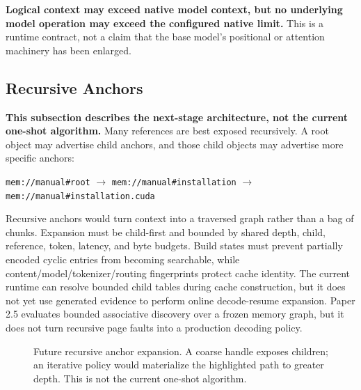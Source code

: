 \documentclass[11pt]{article}
\begin{document}
\textbf{Logical context may exceed native model context, but no underlying model operation
may exceed the configured native limit.} This is a runtime contract, not a claim that the
base model's positional or attention machinery has been enlarged.

\subsection{Recursive Anchors}

\textbf{This subsection describes the next-stage architecture, not the current one-shot
algorithm.} Many references are best exposed recursively.  A root object may advertise child
anchors, and those child objects may advertise more specific anchors:

\begin{center}
\texttt{mem://manual\#root}
$\rightarrow$
\texttt{mem://manual\#installation}
$\rightarrow$
\texttt{mem://manual\#installation.cuda}
\end{center}

Recursive anchors would turn context into a traversed graph rather than a bag of chunks.
Expansion must be child-first and bounded by shared depth, child, reference, token, latency,
and byte budgets. Build states must prevent partially encoded cyclic entries from becoming
searchable, while content/model/tokenizer/routing fingerprints protect cache identity. The
current runtime can resolve bounded child tables during cache construction, but it does not
yet use generated evidence to perform online decode-resume expansion. Paper 2.5 evaluates
bounded associative discovery over a frozen memory graph, but it does not turn recursive
page faults into a production decoding policy.

\begin{figure}[t]
\centering
{}
\caption{Future recursive anchor expansion. A coarse handle exposes children; an iterative
policy would materialize the highlighted path to greater depth. This is not the current
one-shot algorithm.}
\label{fig:recursive-expansion}
\end{figure}
\end{document}
